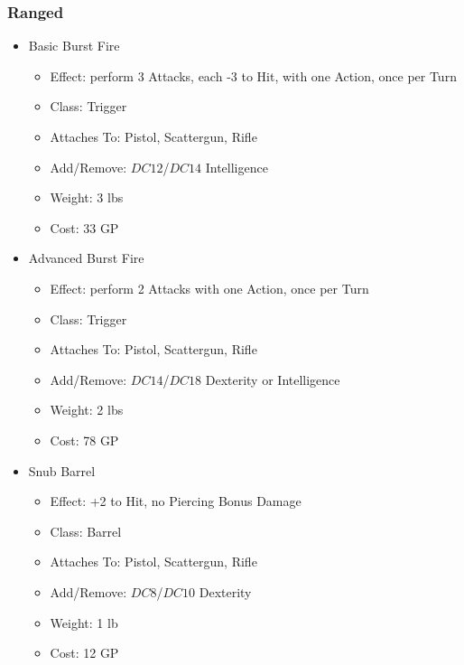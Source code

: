 \documentclass[12pt, landscape]{article}
\begin{document}
\begin{FlushLeft}
\begin{multicols}{2}
			\subsubsection{Ranged}
			\begin{itemize}
				\item Basic Burst Fire
				\begin{itemize}
					\item Effect: perform 3 Attacks, each -3 to Hit, with one Action, once per Turn
					\item Class: Trigger
					\item Attaches To: Pistol, Scattergun, Rifle
					\item Add/Remove: $DC12$/$DC14$ Intelligence
					\item Weight: 3 lbs
					\item Cost: 33 GP
				\end{itemize}
				\item Advanced Burst Fire
				\begin{itemize}
					\item Effect: perform 2 Attacks with one Action, once per Turn
					\item Class: Trigger
					\item Attaches To: Pistol, Scattergun, Rifle
					\item Add/Remove: $DC14$/$DC18$ Dexterity or Intelligence
					\item Weight: 2 lbs
					\item Cost: 78 GP
				\end{itemize}
				\item Snub Barrel
				\begin{itemize}
					\item Effect: +2 to Hit, no Piercing Bonus Damage  
					\item Class: Barrel
					\item Attaches To: Pistol, Scattergun, Rifle
					\item Add/Remove: $DC8$/$DC10$ Dexterity
					\item Weight: 1 lb
					\item Cost: 12 GP
				\end{itemize}
			\end{itemize}
			\vfill \null \columbreak \columnbreak


\end{multicols}
\end{FlushLeft}
\end{document}

